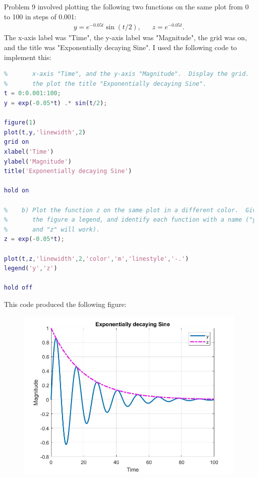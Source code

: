 \documentclass{article}
\begin{document}
\section{}

Problem 9 involved plotting the following two functions on the same plot from 0 to 100 in steps of 0.001:
\begin{align*}
    y = e^{-0.05t}\sin(t/2), && z = e^{-0.05t}.
\end{align*}
The x-axis label was "Time", the y-axis label was "Magnitude", the grid was on, and the title was "Exponentially decaying Sine".  I used the following code to implement this:

\begin{lstlisting}[language=Matlab]
%    a) Plot the function y from zero to 100 in steps of 0.001.  Label the 
%       x-axis "Time", and the y-axis "Magnitude".  Display the grid.  Give
%       the plot the title "Exponentially decaying Sine".
t = 0:0.001:100;
y = exp(-0.05*t) .* sin(t/2);

figure(1)
plot(t,y,'linewidth',2)
grid on
xlabel('Time')
ylabel('Magnitude')
title('Exponentially decaying Sine')

hold on

%    b) Plot the function z on the same plot in a different color.  Give
%       the figure a legend, and identify each function with a name ("y"
%       and "z" will work).
z = exp(-0.05*t);

plot(t,z,'linewidth',2,'color','m','linestyle','-.')
legend('y','z')

hold off
\end{lstlisting}
This code produced the following figure:

\begin{figure}[h]
    \includegraphics[scale=0.35]{matlab1_9.jpg}
    \centering
\end{figure}
\end{document}
